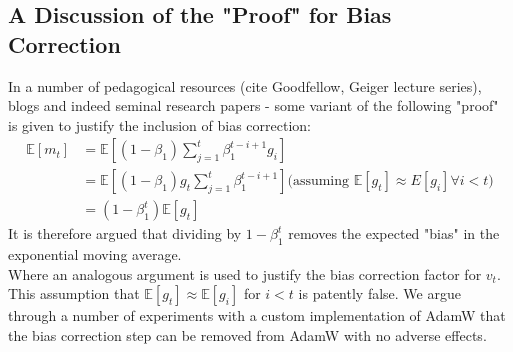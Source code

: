\documentclass[12pt]{book}
\newcommand{\E}{\mathbb{E}}
\begin{document}
\subsection*{A Discussion of the "Proof" for Bias Correction}
In a number of pedagogical resources (cite Goodfellow, Geiger lecture series), blogs and indeed seminal research papers - some variant of the following "proof" is given to justify the inclusion of bias correction:
\begin{align*}
	\E[m_t] &= \E\left[ (1-\beta_1)\sum_{j=1}^{t} {\beta_1^{t-i+1} g_i}  \right]  \\
		&= \E\left[(1-\beta_1)g_t \sum_{j=1}^{t} {\beta_1^{t-i+1}}\right] (\text{assuming $\E[g_t] \approx E[g_i]\forall i<t$)}\\
		&= (1-\beta_1^{t})\E[g_t]
\end{align*}
It is therefore argued that dividing by  $1-\beta_1^{t}$ removes the expected "bias" in the exponential moving average.\\ 
Where an analogous argument is used to justify the bias correction factor for $v_t$. \\
This assumption that $\E[g_t] \approx \E[g_i]$ for $i<t$ is patently false. We argue through a number of experiments with a custom implementation of AdamW that the bias correction step can be removed from AdamW with no adverse effects.
\\
\end{document}
